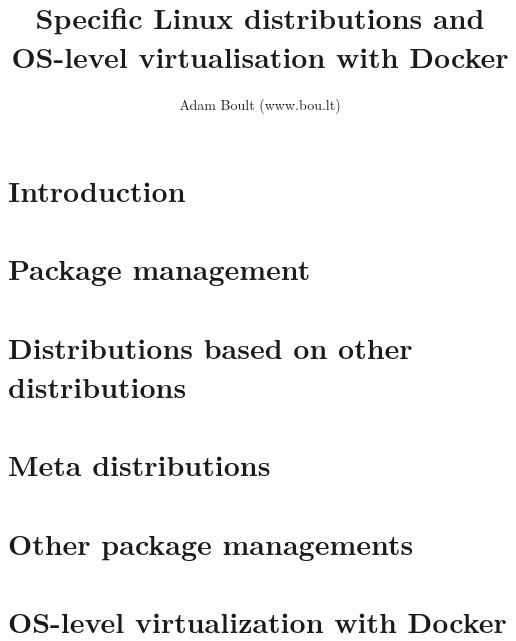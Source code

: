 \documentclass[oneside]{book}
\begin{document}
\author{Adam Boult (www.bou.lt)}
\title{Specific Linux distributions and OS-level virtualisation with Docker}
\maketitle

\setcounter{tocdepth}{0}
\tableofcontents



\part{Introduction}


\part{Package management}











\part{Distributions based on other distributions}


\part{Meta distributions}


\part{Other package managements}



\part{OS-level virtualization with Docker}

\end{document}
